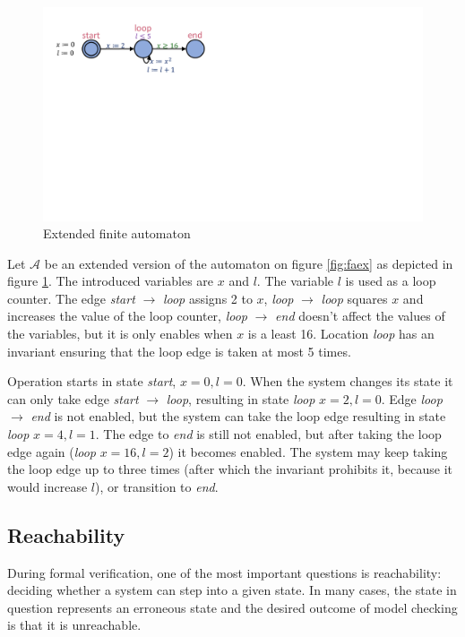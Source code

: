 \begin{figure}
	\centering
	\begin{minipage}{0.6\textwidth}
		\includegraphics[width=\textwidth]{include/figures/loop_example_discrete}%
		\caption{Extended finite automaton}
		\label{fig:efaex}
	\end{minipage}
\end{figure}

\begin{example}
	Let $\mathcal{A}$ be an extended version of the automaton on figure \ref{fig:faex} as depicted in figure \ref{fig:efaex}. The introduced variables are $x$ and $l$. The variable $l$ is used as a loop counter. The edge \emph{start} $\to$ \emph{loop} assigns 2 to $x$, \emph{loop} $\to$ \emph{loop} squares $x$ and increases the value of the loop counter, \emph{loop} $\to$ \emph{end} doesn't affect the values of the variables, but it is only enables when $x$ is a least 16. Location \emph{loop} has an invariant ensuring that the loop edge is taken at most 5 times.
	
	Operation starts in state \emph{start}, $x=0, l=0$. When the system changes its state it can only take edge \emph{start} $\to$ \emph{loop}, resulting in state \emph{loop} $x=2, l=0$. Edge  \emph{loop} $\to$ \emph{end} is not enabled, but the system can take the loop edge resulting in state \emph{loop} $x=4, l=1$. The edge to \emph{end} is still not enabled, but after taking the loop edge again (\emph{loop} $x=16, l=2$) it becomes enabled. The system may keep taking the loop edge up to three times (after which the invariant prohibits it, because it would increase $l$), or transition to \emph{end}.
\end{example}

\subsection{Reachability}
During formal verification, one of the most important questions is reachability: deciding whether a system can step into a given state. In many cases, the state in question represents an erroneous state and the desired outcome of model checking is that it is unreachable.

